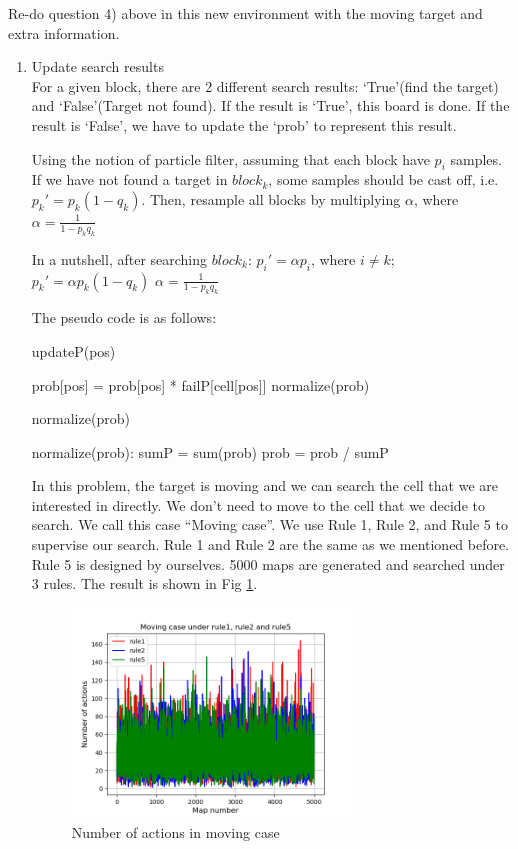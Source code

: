 \documentclass[letter]{article}
\begin{document}
\par{Re-do question 4) above in this new environment with the moving target and extra information.}
\begin{enumerate}
	\item {Update search results} \\
	For a given block, there are 2 different search results: `True'(find the target) and `False'(Target not found). If the result is `True', this board is done. If the result is `False', we have to update the `prob' to represent this result.
		
	Using the notion of particle filter, assuming that each block have $p_i$ samples. If we have not found a target in $block_k$, some samples should be cast off, i.e. $p_k' = p_k(1-q_k)$. Then, resample all blocks by multiplying $\alpha$, where $\alpha = \frac{1}{1-p_kq_k}$
		
	In a nutshell, after searching $block_k$: 
	$p_i' = \alpha p_i$, where $i\ne k$; 
	$p_k' = \alpha p_k(1-q_k)$
	$\alpha = \frac{1}{1-p_kq_k}$
	
	The pseudo code is as follows:
	\begin{algorithm}[H]
		\caption{updateP(pos)}
		\begin{algorithmic}
			\STATE prob[pos] = prob[pos] * failP[cell[pos]]
			\STATE normalize(prob)
			\RETURN 
		\end{algorithmic}
	\end{algorithm}
	\begin{algorithm}[H]
	\caption{normalize(prob)}
	\begin{algorithmic}
		\STATE normalize(prob):
		\STATE sumP = sum(prob)
		\STATE prob = prob / sumP
		\RETURN 
	\end{algorithmic}
	\end{algorithm}

	In this problem, the target is moving and we can search the cell that we are interested in
	directly. We don’t need to move to the cell that we decide to search. We call this case
	“Moving case”. We use Rule 1, Rule 2, and Rule 5 to supervise our search. Rule 1 and
	Rule 2 are the same as we mentioned before. Rule 5 is designed by ourselves. 5000
	maps are generated and searched under 3 rules. The result is shown in Fig \ref{fig:part2-first}.
	
	\begin{figure}[H]
		\centering
		\includegraphics[width=0.7\textwidth]{fig/part2-first.png}
		\caption{Number of actions in moving case}
		\label{fig:part2-first}
	\end{figure}
	

\end{enumerate}
\end{document}
